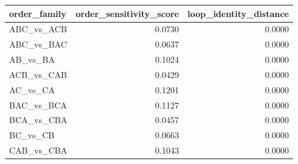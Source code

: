 \begin{tabular}{lrr}
\toprule
order_family & order_sensitivity_score & loop_identity_distance \\
\midrule
ABC_vs_ACB & 0.0730 & 0.0000 \\
ABC_vs_BAC & 0.0637 & 0.0000 \\
AB_vs_BA & 0.1024 & 0.0000 \\
ACB_vs_CAB & 0.0429 & 0.0000 \\
AC_vs_CA & 0.1201 & 0.0000 \\
BAC_vs_BCA & 0.1127 & 0.0000 \\
BCA_vs_CBA & 0.0457 & 0.0000 \\
BC_vs_CB & 0.0663 & 0.0000 \\
CAB_vs_CBA & 0.1043 & 0.0000 \\
\bottomrule
\end{tabular}
